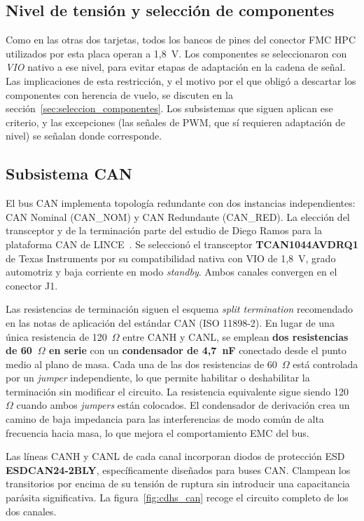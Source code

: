 \subsection{Nivel de tensión y selección de componentes}

Como en las otras dos tarjetas, todos los bancos de pines del conector FMC HPC utilizados por esta
placa operan a 1,8~V. Los componentes se seleccionaron con \textit{VIO} nativo a ese nivel, para
evitar etapas de adaptación en la cadena de señal. Las implicaciones de esta restricción, y el
motivo por el que obligó a descartar los componentes con herencia de vuelo, se discuten en la
sección~\ref{sec:seleccion_componentes}. Los subsistemas que siguen aplican ese criterio, y las
excepciones (las señales de PWM, que sí requieren adaptación de nivel) se señalan donde
corresponde.

\subsection{Subsistema CAN}

El bus CAN implementa topología redundante con dos instancias independientes: CAN
Nominal (CAN\_NOM) y CAN Redundante (CAN\_RED). La elección del transceptor y de la terminación
parte del estudio de Diego Ramos para la plataforma CAN de LINCE~\cite{ramos2026can}. Se seleccionó el transceptor
\textbf{TCAN1044AVDRQ1} de Texas Instruments por su compatibilidad nativa con VIO de 1,8~V,
grado automotriz y baja corriente en modo \textit{standby}. Ambos canales convergen en el
conector J1.

Las resistencias de terminación siguen el esquema \textit{split termination} recomendado en las
notas de aplicación del estándar CAN (ISO 11898-2). En lugar de una única resistencia de
120~$\Omega$ entre CANH y CANL, se emplean \textbf{dos resistencias de 60~$\Omega$ en serie} con un
\textbf{condensador de 4,7~nF} conectado desde el punto medio al plano de masa. Cada una de
las dos resistencias de 60~$\Omega$ está controlada por un \textit{jumper} independiente, lo que
permite habilitar o deshabilitar la terminación sin modificar el circuito. La resistencia
equivalente sigue siendo 120~$\Omega$ cuando ambos \textit{jumpers} están colocados. El
condensador de derivación crea un camino de baja impedancia para las interferencias de
modo común de alta frecuencia hacia masa, lo que mejora el comportamiento EMC del bus.

Las líneas CANH y CANL de cada canal incorporan diodos de protección ESD
\textbf{ESDCAN24-2BLY}, específicamente diseñados para buses CAN. Clampean los transitorios
por encima de su tensión de ruptura sin introducir una capacitancia parásita significativa. La
figura~\ref{fig:cdhs_can} recoge el circuito completo de los dos canales.

